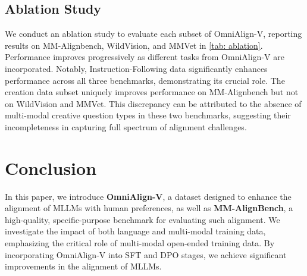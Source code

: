 \subsection{Ablation Study}
We conduct an ablation study to evaluate each subset of OmniAlign-V, 
reporting results on MM-Alignbench, WildVision, and MMVet in \cref{tab: ablation}. 
Performance improves progressively as different tasks from OmniAlign-V are incorporated. 
Notably, Instruction-Following data significantly enhances performance across all three benchmarks, 
demonstrating its crucial role. 
The creation data subset uniquely improves performance on MM-Alignbench but not on WildVision and MMVet.
This discrepancy can be attributed to the absence of multi-modal creative question types in these two benchmarks, suggesting their incompleteness in capturing full spectrum of alignment challenges.



\section{Conclusion}
In this paper, we introduce \textbf{OmniAlign-V}, 
a dataset designed to enhance the alignment of MLLMs with human preferences, 
as well as \textbf{MM-AlignBench}, 
a high-quality, specific-purpose benchmark for evaluating such alignment. 
We investigate the impact of both language and multi-modal training data, 
emphasizing the critical role of multi-modal open-ended training data. 
By incorporating OmniAlign-V into SFT and DPO stages, we achieve significant improvements in the alignment of MLLMs. 

